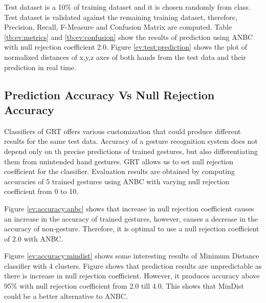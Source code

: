 Test dataset is a 10\% of training dataset and it is chosen randomly from class. Test dataset is validated against the remaining training dataset, therefore, Precision, Recall, F-Measure and Confusion Matrix are computed. Table \ref{tb:ev:metrics} and \ref{tb:ev:confusion} show the results of prediction using ANBC with null rejection coefficient 2.0. Figure \ref{ev:test:prediction} shows the plot of normalized distances of x,y,z axes of both hands from the test data and their prediction in real time.

 

\subsection{Prediction Accuracy Vs Null Rejection Accuracy} \label{sec:ev:accuracy} Classifiers of GRT offers various customization that could produce different results for the same test data. Accuracy of a gesture recognition system does not depend only on th precise predictions of trained gestures, but also differentiating them from unintended hand gestures. GRT allows us to set null rejection coefficient for the classifier. Evaluation results are obtained by computing accuracies of 5 trained gestures using ANBC with varying null rejection coefficient from 0 to 10.

Figure \ref{ev:accuracy:anbc} shows that increase in null rejection coefficient causes an increase in the accuracy of trained gestures, however, causes a decrease in the accuracy of non-gesture. Therefore, it is optimal to use a null rejection coefficient of 2.0 with ANBC.

Figure \ref{ev:accuracy:mindist} shows some interesting results of Minimum Distance classifier with 4 clusters. Figure shows that prediction results are unpredictable as there is increase in null rejection coefficient. However, it produces accuracy above 95\% with null rejection coefficient from 2.0 till 4.0. This shows that MinDist could be a better alternative to ANBC. 

 


